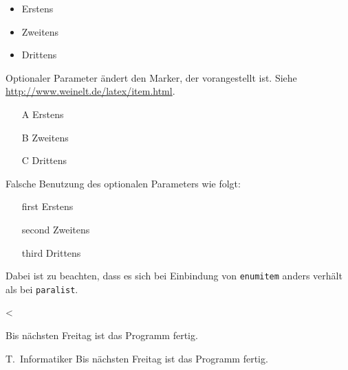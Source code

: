 \begin{itemize}
\item Erstens
\item Zweitens
\item Drittens
\end{itemize}

Optionaler Parameter ändert den Marker, der vorangestellt ist. Siehe \url{http://www.weinelt.de/latex/item.html}.
\begin{itemize}
\item[A] Erstens
\item[B] Zweitens
\item[C] Drittens
\end{itemize}

Falsche Benutzung des optionalen Parameters wie folgt:
\begin{itemize}
\item[first] Erstens
\item[second] Zweitens
\item[third] Drittens
\end{itemize}
Dabei ist zu beachten, dass es sich bei Einbindung von \texttt{enumitem} anders verhält als bei \texttt{paralist}.

<%

\begin{fquote}[T.\ Informatiker]
Bis nächsten Freitag ist das Programm fertig.
\end{fquote}

\begin{gfquote}{T.\ Informatiker}
Bis nächsten Freitag ist das Programm fertig.
\end{gfquote}


